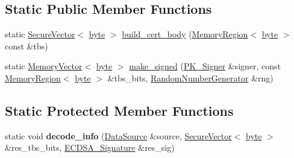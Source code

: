 \subsection*{Static Public Member Functions}
\begin{DoxyCompactItemize}
\item 
static \hyperlink{classBotan_1_1SecureVector}{Secure\-Vector}$<$ \hyperlink{namespaceBotan_a7d793989d801281df48c6b19616b8b84}{byte} $>$ \hyperlink{classBotan_1_1EAC1__1__gen__CVC_a3fde6dfc710923dfcb6e3b3fc7b43b2a}{build\-\_\-cert\-\_\-body} (\hyperlink{classBotan_1_1MemoryRegion}{Memory\-Region}$<$ \hyperlink{namespaceBotan_a7d793989d801281df48c6b19616b8b84}{byte} $>$ const \&tbs)
\item 
static \hyperlink{classBotan_1_1MemoryVector}{Memory\-Vector}$<$ \hyperlink{namespaceBotan_a7d793989d801281df48c6b19616b8b84}{byte} $>$ \hyperlink{classBotan_1_1EAC1__1__gen__CVC_ae586dbccae5788aa1e43c4f7b88f7a59}{make\-\_\-signed} (\hyperlink{classBotan_1_1PK__Signer}{P\-K\-\_\-\-Signer} \&signer, const \hyperlink{classBotan_1_1MemoryRegion}{Memory\-Region}$<$ \hyperlink{namespaceBotan_a7d793989d801281df48c6b19616b8b84}{byte} $>$ \&tbs\-\_\-bits, \hyperlink{classBotan_1_1RandomNumberGenerator}{Random\-Number\-Generator} \&rng)
\end{DoxyCompactItemize}
\subsection*{Static Protected Member Functions}
\begin{DoxyCompactItemize}
\item 
\hypertarget{classBotan_1_1EAC1__1__gen__CVC_aba4961b967f5544ba74a5e48b80aa73d}{static void {\bfseries decode\-\_\-info} (\hyperlink{classBotan_1_1DataSource}{Data\-Source} \&source, \hyperlink{classBotan_1_1SecureVector}{Secure\-Vector}$<$ \hyperlink{namespaceBotan_a7d793989d801281df48c6b19616b8b84}{byte} $>$ \&res\-\_\-tbs\-\_\-bits, \hyperlink{classBotan_1_1ECDSA__Signature}{E\-C\-D\-S\-A\-\_\-\-Signature} \&res\-\_\-sig)}\label{classBotan_1_1EAC1__1__gen__CVC_aba4961b967f5544ba74a5e48b80aa73d}

\end{DoxyCompactItemize}
